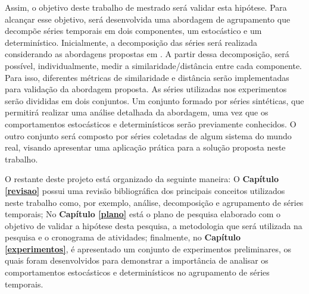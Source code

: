 Assim, o objetivo deste trabalho de mestrado será validar esta hipótese. Para alcançar esse objetivo, será desenvolvida uma abordagem de agrupamento que decompõe séries temporais em dois componentes, um estocástico e um determinístico. Inicialmente, a decomposição das séries será realizada considerando as abordagens propostas em . A partir dessa decomposição, será possível, individualmente, medir a similaridade/distância entre cada componente. Para isso, diferentes métricas de similaridade e distância serão implementadas para validação da abordagem proposta. As séries utilizadas nos experimentos serão divididas em dois conjuntos. Um conjunto formado por séries sintéticas, que permitirá realizar uma análise detalhada da abordagem, uma vez que os comportamentos estocásticos e determinísticos serão previamente conhecidos. O outro conjunto será composto por séries coletadas de algum sistema do mundo real, visando apresentar uma aplicação prática para a solução proposta neste trabalho.

O restante deste projeto  está organizado da seguinte maneira: O \textbf{Capítulo \ref{revisao}} possui uma revisão bibliográfica dos principais conceitos utilizados neste trabalho como, por exemplo, análise, decomposição e agrupamento de séries temporais; No \textbf{Capítulo \ref{plano}} está o plano de pesquisa elaborado com o objetivo de validar a hipótese desta pesquisa, a metodologia que será utilizada na pesquisa e o cronograma de atividades; finalmente, no \textbf{Capítulo \ref{experimentos}}, é apresentado um conjunto de experimentos preliminares, os quais foram desenvolvidos para demonstrar a importância de analisar os comportamentos estocásticos e determinísticos no agrupamento de séries temporais.
